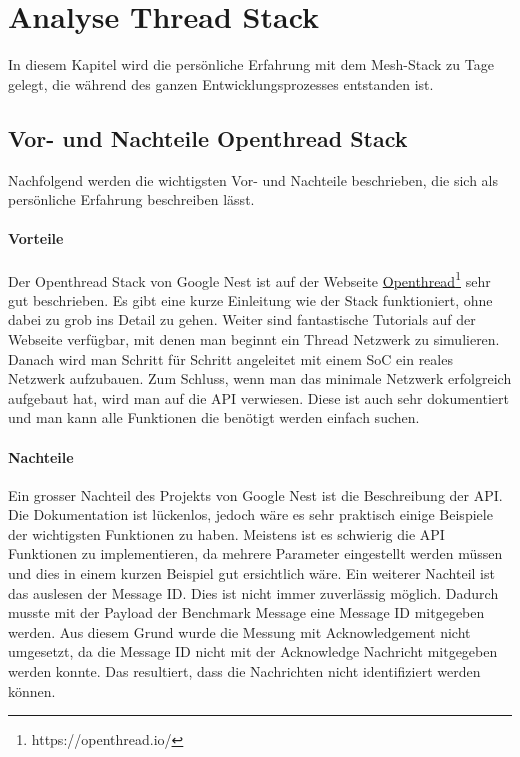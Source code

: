 \clearpage
\section{Analyse Thread Stack}\label{sec:AnalyseThreadStack}
In diesem Kapitel wird die persönliche Erfahrung mit dem Mesh-Stack zu Tage gelegt, die während des ganzen Entwicklungsprozesses entstanden ist.

\subsection{Vor- und Nachteile Openthread Stack}\label{susec:ThreadVorNachteile}
Nachfolgend werden die wichtigsten Vor- und Nachteile beschrieben, die sich als persönliche Erfahrung beschreiben lässt.
\paragraph{Vorteile}
Der Openthread Stack von Google Nest ist auf der Webseite \href{https://openthread.io/}{Openthread\footnote{\url{https://openthread.io/}}} sehr gut beschrieben. Es gibt eine kurze Einleitung wie der Stack funktioniert, ohne dabei zu grob ins Detail zu gehen. Weiter sind fantastische Tutorials auf der Webseite verfügbar, mit denen man beginnt ein Thread Netzwerk zu simulieren. Danach wird man Schritt für Schritt angeleitet mit einem SoC ein reales Netzwerk aufzubauen. Zum Schluss, wenn man das minimale Netzwerk erfolgreich aufgebaut hat, wird man auf die API verwiesen. Diese ist auch sehr dokumentiert und man kann alle Funktionen die benötigt werden einfach suchen.

\paragraph{Nachteile}
Ein grosser Nachteil des Projekts von Google Nest ist die Beschreibung der API. Die Dokumentation ist lückenlos, jedoch wäre es sehr praktisch einige Beispiele der wichtigsten Funktionen zu haben. Meistens ist es schwierig die API Funktionen zu implementieren, da mehrere Parameter eingestellt werden müssen und dies in einem kurzen Beispiel gut ersichtlich wäre. Ein weiterer Nachteil ist das auslesen der Message ID. Dies ist nicht immer zuverlässig möglich. Dadurch musste mit der Payload der Benchmark Message eine Message ID mitgegeben werden. Aus diesem Grund wurde die Messung mit Acknowledgement nicht umgesetzt, da die Message ID nicht mit der Acknowledge Nachricht mitgegeben werden konnte. Das resultiert, dass die Nachrichten nicht identifiziert werden können.

